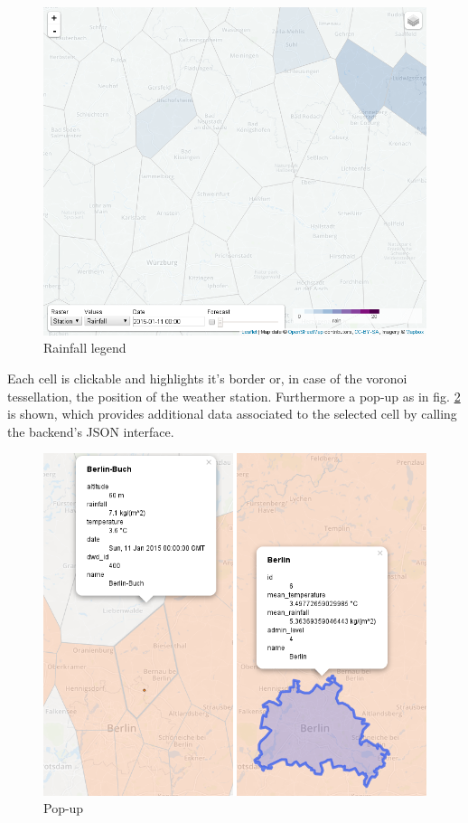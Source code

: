 \documentclass[paper=a4, fontsize=11pt]{article} %
\numberwithin{equation}{section} %
\numberwithin{figure}{section} %
\numberwithin{table}{section} %
\begin{document}
\begin{figure}[htbp]
\centering
\includegraphics[width=.6\textwidth]{pictures/screenshot-legend-rain.png}
\caption{Rainfall legend}
\label{fig:rainfall-legend}
\end{figure}

\newpage
Each cell is clickable and highlights it's border or, in case of the
voronoi tessellation, the position of the weather station. Furthermore a
pop-up as in fig. \ref{fig:popup} is shown, which provides additional data associated to the
selected cell by calling the backend's JSON interface.

\begin{figure}[htbp]
\centering
\includegraphics[width=1\textwidth]{pictures/screenshot-popup.png}
\caption{Pop-up}
\label{fig:popup}
\end{figure}
\end{document}
